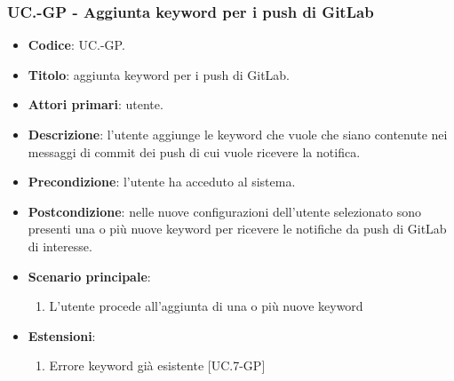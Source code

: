 
	\subsubsection{UC\theuccount.\thesubuccount-GP - Aggiunta keyword per i push di GitLab}

		\begin{itemize}
			\item \textbf{Codice}: UC\theuccount.\thesubuccount-GP.
			\item \textbf{Titolo}: aggiunta keyword per i push di GitLab.
			\item \textbf{Attori primari}: utente.
			\item \textbf{Descrizione}: l’utente aggiunge le keyword che vuole che siano contenute nei messaggi di commit dei push di cui vuole ricevere la notifica.
			\item \textbf{Precondizione}: l’utente ha acceduto al sistema.
			\item \textbf{Postcondizione}: nelle nuove configurazioni dell'utente selezionato sono presenti una o più nuove keyword per ricevere le notifiche da push di GitLab di interesse.
			\item \textbf{Scenario principale}:
			\begin{enumerate}
				\item L'utente procede all'aggiunta di una o più nuove keyword
			\end{enumerate}
			\item \textbf{Estensioni}:
			\begin{enumerate}
				\item Errore keyword già esistente [UC\theuccount.7-GP]
			\end{enumerate}
		\end{itemize}

